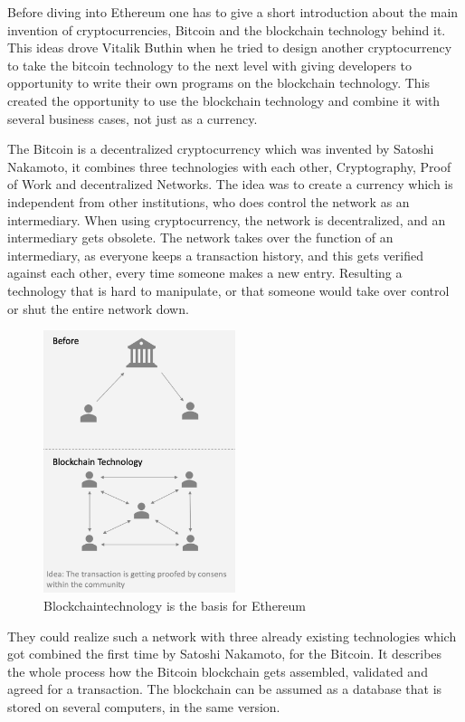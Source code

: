 Before diving into Ethereum one has to give a short introduction about the main invention of cryptocurrencies, Bitcoin and the blockchain technology behind it. This ideas drove Vitalik  Buthin when he tried to design another cryptocurrency to take the bitcoin technology to the next level with giving developers to opportunity to write their own programs on the blockchain technology. This created the opportunity to use the blockchain technology and combine it with several business cases, not just as a currency. 

The Bitcoin is a decentralized cryptocurrency which was invented by Satoshi Nakamoto, it combines three technologies with each other, Cryptography, Proof of Work and decentralized Networks. The idea was to create a currency which is independent from other institutions, who does control the network as an intermediary. When using cryptocurrency, the network is decentralized, and an intermediary gets obsolete. The network takes over the function of an intermediary, as everyone keeps a transaction history, and this gets verified against each other, every time someone makes a new entry. Resulting a technology that is hard to manipulate, or that someone would take over control or shut the entire network down. \cite{grishchenko2018semantic}

\begin{figure}[ht]
\caption{Blockchaintechnology is the basis for Ethereum} 
\includegraphics[width=0.5\textwidth]{blockchaintech}
\end{figure}

They could realize such a network with three already existing technologies which got combined the first time by Satoshi Nakamoto, for the Bitcoin. It describes the whole process how the Bitcoin blockchain gets assembled, validated and agreed for a transaction. The blockchain can be assumed as a database that is stored on several computers, in the same version. \cite{grishchenko2018semantic} 

